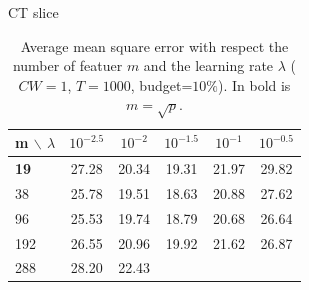 \documentclass{article}
\begin{document}
\begin{table}[t]
\caption{Average mean square error with respect the number of 
featuer $m$ and the learning rate $\lambda$ ($CW=1$, $T=1000$, budget=$10\%$). 
In bold is $m=\sqrt{p}$.}
\label{tab:maxFeat}
\vskip 0.15in
\begin{center}
\begin{small}
CT slice
\begin{tabular}{l|ccccc}
\hline
m $\backslash$ $\lambda$  &  $10^{-2.5}$ & $10^{-2}$ & $10^{-1.5}$ & 
$10^{-1}$ & $10^{-0.5}$ \\
\hline
{\bf 19} & \cellcolor[gray]{0.59} 27.28 & \cellcolor[gray]{0.92} 20.34 & 
\cellcolor[gray]{0.97} 19.31 & \cellcolor[gray]{0.84} 21.97 & 
\cellcolor[gray]{0.47} 29.82 \\
38 & \cellcolor[gray]{0.66} 25.78 & \cellcolor[gray]{0.96} 19.51 & 
\cellcolor[gray]{1.00} 18.63 & \cellcolor[gray]{0.89} 20.88 & 
\cellcolor[gray]{0.58} 27.62 \\
96 & \cellcolor[gray]{0.68} 25.53 & \cellcolor[gray]{0.95} 19.74 & 
\cellcolor[gray]{0.99} 18.79 & \cellcolor[gray]{0.90} 20.68 & 
\cellcolor[gray]{0.62} 26.64 \\
192 & \cellcolor[gray]{0.63} 26.55 & \cellcolor[gray]{0.89} 20.96 & 
\cellcolor[gray]{0.94} 19.92 & \cellcolor[gray]{0.86} 21.62 & 
\cellcolor[gray]{0.61} 26.87 \\
288 & \cellcolor[gray]{0.55} 28.20 & \cellcolor[gray]{0.82} 22.43 & 

\end{tabular}
\end{small}
\end{center}
\end{table}
\end{document}

